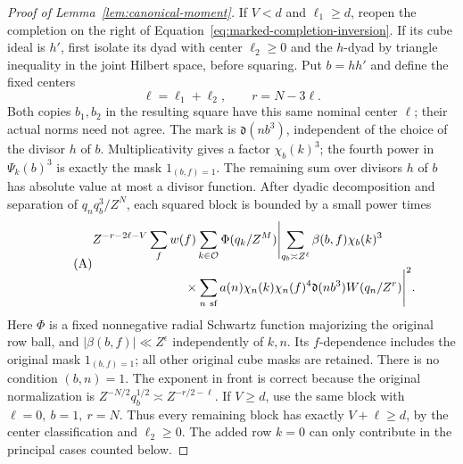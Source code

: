 \documentclass[11pt,a4paper]{article}
\numberwithin{equation}{section}
\numberwithin{figure}{section}
\theoremstyle{definition}
\theoremstyle{remark}
\begin{document}
\begin{proof}[Proof of Lemma~\ref{lem:canonical-moment}]
If \(V<d\) and \(\ell_1\ge d\), reopen the completion on the right of
Equation~\eqref{eq:marked-completion-inversion}.  If its cube ideal is
\(h'\), first isolate its dyad with center \(\ell_2\ge0\) and the
\(h\)-dyad by triangle inequality in the joint Hilbert space, before
squaring.  Put \(b=hh'\) and define the fixed centers
\[
 \ell=\ell_1+\ell_2,\qquad r=N-3\ell.
\]
Both copies \(b_1,b_2\) in the resulting square have this same nominal
center \(\ell\); their actual norms need not agree.  The mark is
\(\mathfrak d(nb^3)\), independent of the
choice of the divisor \(h\) of \(b\).  Multiplicativity gives a factor
\(\chi_b(k)^3\); the fourth power in \(\Psi_k(b)^3\) is exactly the
mask \(1_{(b,f)=1}\).  The remaining sum over divisors \(h\) of \(b\)
has absolute value at most a divisor function.  After dyadic
decomposition and separation of \(q_nq_b^3/Z^N\), each squared block
is bounded by a small power times
\begin{equation}\tag{A}\label{eq:canonical-block}
 \begin{split}
 &Z^{-r-2\ell-V}\sum_f w(f)\sum_{k\in\mathcal O}\Phi(q_k/Z^M)
 \Biggl|\sum_{q_b\asymp Z^\ell}\beta(b,f)\chi_b(k)^3\\
 &\hspace{26mm}\times
       \sum_{n\ {\rm sf}}a(n)\chi_n(k)\chi_n(f)^4
       \mathfrak d(nb^3)W(q_n/Z^r)\Biggr|^2 .
 \end{split}
\end{equation}
Here \(\Phi\) is a fixed nonnegative radial Schwartz function
majorizing the original row ball, and
\(|\beta(b,f)|\ll Z^\epsilon\) independently of \(k,n\).  Its
\(f\)-dependence includes the original mask \(1_{(b,f)=1}\);
all other original cube masks are retained.  There is no condition
\((b,n)=1\).  The exponent in front is correct because the original
normalization is \(Z^{-N/2}q_b^{1/2}\asymp Z^{-r/2-\ell}\).
If \(V\ge d\), use the same block with \(\ell=0,\ b=1,\ r=N\).
Thus every remaining block has exactly \(V+\ell\ge d\), by the center
classification and \(\ell_2\ge0\).  The added row \(k=0\)
can only contribute in the principal cases counted below.


\end{proof}
\end{document}
